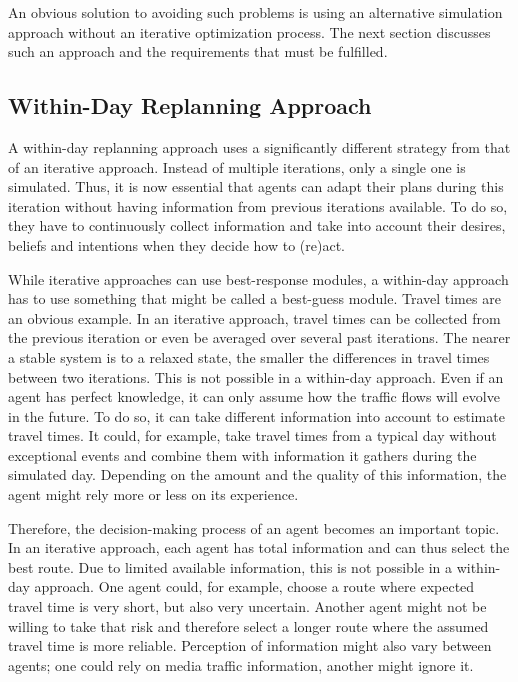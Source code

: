 An obvious solution to avoiding such problems is using an alternative simulation approach without an iterative optimization process. The next section discusses such an approach and the requirements that must be fulfilled.

\subsection{Within-Day Replanning Approach}
A within-day replanning approach uses a significantly different strategy from that of an iterative approach. Instead of multiple iterations, only a single one is simulated. Thus, it is now essential that agents can adapt their plans during this iteration without having information from previous iterations available. To do so, they have to continuously collect information and take into account their desires, beliefs and intentions when they decide how to (re)act.

While iterative approaches can use best-response modules, a within-day approach has to use something that might be called a best-guess module. Travel times are an obvious example. In an iterative approach, travel times can be collected from the previous iteration or even be averaged over several past iterations. The nearer a stable system is to a relaxed state, the smaller the differences in travel times between two iterations. This is not possible in a within-day approach. Even if an agent has perfect knowledge, it can only assume how the traffic flows will evolve in the future. To do so, it can take different information into account to estimate travel times. It could, for example, take travel times from a typical day without exceptional events and combine them with information it gathers during the simulated day. Depending on the amount and the quality of this information, the agent might rely more or less on its experience.

Therefore, the decision-making process of an agent becomes an important topic. In an iterative approach, each agent has total information and can thus select the best route. Due to limited available information, this is not possible in a within-day approach. One agent could, for example, choose a route where expected travel time is very short, but also very uncertain. Another agent might not be willing to take that risk and therefore select a longer route where the assumed travel time is more reliable. Perception of information might also vary between agents; one could rely on media traffic information, another might ignore it.

